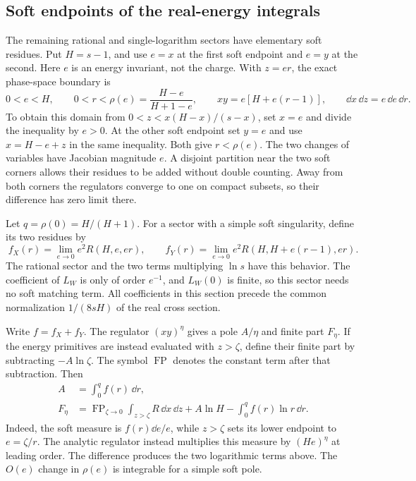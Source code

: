 \subsection{Soft endpoints of the real-energy integrals}
The remaining rational and single-logarithm sectors have elementary
soft residues. Put $H=s-1$, and use $e=x$ at the first soft endpoint
and $e=y$ at the second. Here $e$ is an energy invariant, not the
charge. With $z=er$, the exact phase-space boundary is
\begin{equation}
 0<e<H,\qquad 0<r<\rho(e)=\frac{H-e}{H+1-e},\qquad
 xy=e[H+e(r-1)],\qquad \dd x\,\dd z=e\,\dd e\,\dd r.
 \label{eq:comp-real-soft-domain}
\end{equation}
To obtain this domain from $0<z<x(H-x)/(s-x)$, set
$x=e$ and divide the inequality by $e>0$. At the other soft
endpoint set $y=e$ and use $x=H-e+z$ in the same inequality.
Both give $r<\rho(e)$. The two changes of variables have Jacobian
magnitude $e$. A disjoint partition near the two soft corners
allows their residues to be added without double counting. Away
from both corners the regulators converge to one on compact
subsets, so their difference has zero limit there.

Let $q=\rho(0)=H/(H+1)$. For a sector with a simple soft
singularity, define its two residues by
\begin{equation}
 f_X(r)=\lim_{e\to0}e^2R(H,e,er),\qquad
 f_Y(r)=\lim_{e\to0}e^2R(H,H+e(r-1),er).
\end{equation}
The rational sector and the two terms multiplying $\ln s$ have
this behavior. The coefficient of $L_W$ is only of order $e^{-1}$,
and $L_W(0)$ is finite, so this sector needs no soft matching term.
All coefficients in this section precede the common normalization
$1/(8sH)$ of the real cross section.

Write $f=f_X+f_Y$. The regulator $(xy)^\eta$ gives a pole
$A/\eta$ and finite part $F_\eta$. If the energy primitives are
instead evaluated with $z>\zeta$, define their finite part by
subtracting $-A\ln\zeta$. The symbol $\operatorname{FP}$ denotes
the constant term after that subtraction. Then
\begin{align}
 A&=\int_0^q f(r)\,\dd r,\\
 F_\eta&=\operatorname{FP}_{\zeta\to0}
                \int_{z>\zeta}R\,\dd x\,\dd z
       +A\ln H-\int_0^q f(r)\ln r\,\dd r.
 \label{eq:comp-real-simple-matching}
\end{align}
Indeed, the soft measure is $f(r)\dd e/e$, while $z>\zeta$
sets its lower endpoint to $e=\zeta/r$. The analytic regulator
instead multiplies this measure by $(He)^\eta$ at leading order.
The difference produces the two logarithmic terms above. The
$O(e)$ change in $\rho(e)$ is integrable for a simple soft pole.


